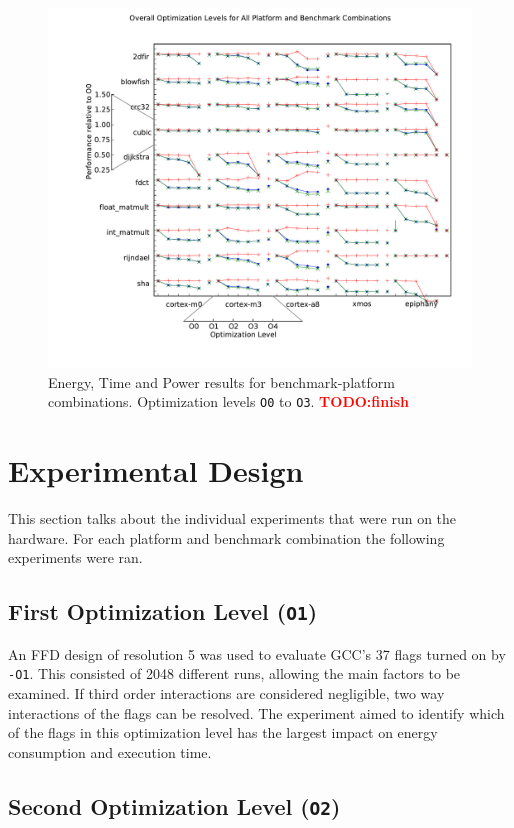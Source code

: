 \documentclass[twocolumn]{article}
\newcommand{\nsection}[1]{\section{\bfseries #1}}
\newcommand{\todo}[1]{\textbf{\textcolor{red}{#1}}}
\let\oldcaption\caption
\renewcommand{\caption}[1]{\oldcaption{\textup{#1}}}
\begin{document}
\begin{figure}[tb!]
	\centering
	\includegraphics[width=\textwidth,clip, trim=2cm 1.5cm 0 2cm]{levels.pdf}
	\caption{Energy, Time and Power results for benchmark-platform combinations. Optimization levels \texttt{O0} to \texttt{O3}. \todo{TODO:finish}}
	\label{Fig:OverallView}
\end{figure}

\nsection{Experimental Design}

This section talks about the individual experiments that were run on the hardware. For each platform and benchmark combination the following experiments were ran.

\subsection*{First Optimization Level (\texttt{O1})}

An FFD design of resolution 5 was used to evaluate GCC's 37 flags turned on by \texttt{-O1}. This consisted of 2048 different runs, allowing the main factors to be examined. If third order interactions are considered negligible, two way interactions of the flags can be resolved. The experiment aimed to identify which of the flags in this optimization level has the largest impact on energy consumption and execution time.

\subsection*{Second Optimization Level (\texttt{O2})}
\end{document}
